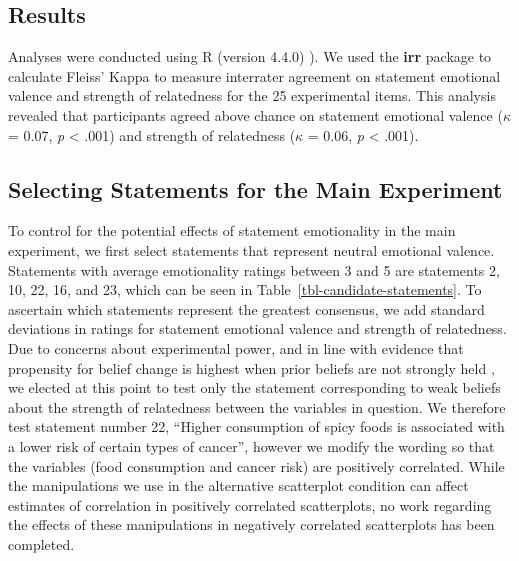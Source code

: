 \documentclass[sigconf]{acmart}
\begin{document}
\subsection{Results}\label{sec-results-pre}

Analyses were conducted using R (version 4.4.0) \citep{rcore}). We used
the \textbf{irr} package to calculate Fleiss' Kappa to measure
interrater agreement on statement emotional valence and strength of
relatedness for the 25 experimental items. This analysis revealed that
participants agreed above chance on statement emotional valence
(\(\kappa\) = 0.07, \emph{p} \textless{} .001) and strength of
relatedness (\(\kappa\) = 0.06, \emph{p} \textless{} .001).

\subsection{Selecting Statements for the Main
Experiment}\label{sec-selecting-statements}

To control for the potential effects of statement emotionality in the
main experiment, we first select statements that represent neutral
emotional valence. Statements with average emotionality ratings between
3 and 5 are statements 2, 10, 22, 16, and 23, which can be seen in
Table~\ref{tbl-candidate-statements}. To ascertain which statements
represent the greatest consensus, we add standard deviations in ratings
for statement emotional valence and strength of relatedness. Due to
concerns about experimental power, and in line with evidence that
propensity for belief change is highest when prior beliefs are not
strongly held \citep{xiong_2022, markant_2023}, we elected at this point
to test only the statement corresponding to weak beliefs about the
strength of relatedness between the variables in question. We therefore
test statement number 22, ``Higher consumption of spicy foods is
associated with a lower risk of certain types of cancer'', however we
modify the wording so that the variables (food consumption and cancer
risk) are positively correlated. While the manipulations we use in the
alternative scatterplot condition can affect estimates of correlation in
positively correlated scatterplots, no work regarding the effects of
these manipulations in negatively correlated scatterplots has been
completed.
\end{document}
